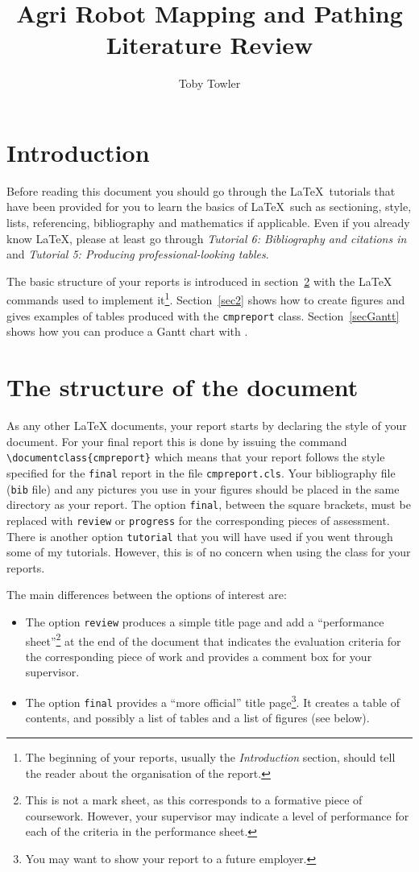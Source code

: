 \documentclass[review]{cmpreport}
\title{Agri Robot Mapping and Pathing Literature Review}
\author{Toby Towler}
\begin{document}
\section{Introduction}

Before reading this document you should go through the \LaTeX\ tutorials that have been provided for you to learn the basics of \LaTeX\ such as sectioning, style, lists, referencing, bibliography and mathematics if applicable.
Even if you already  know \LaTeX{}, please at least go through \emph{Tutorial 6: Bibliography and citations in \LaTeXe{}} and \emph{Tutorial 5: Producing professional-looking tables}.

The basic structure of your reports is introduced in section~\ref{sec1} with the \LaTeX{} commands used to implement it\footnote{The beginning of your reports, usually the \emph{Introduction} section, should tell the reader about the organisation of the report.}. Section~\ref{sec2} shows how to create figures and gives examples of tables produced with the \verb/cmpreport/ class. Section~\ref{secGantt} shows how you can produce a Gantt chart with \LaTeXe{}. 

\section{The structure of the document} \label{sec1}

As any other \LaTeX{} documents, your report starts by declaring the style of your document. For your final report this is done by issuing the command 
\texttt{\textbackslash{}documentclass\allowbreak [final]\{cmpreport\}}
which means that your report follows the style specified for the \texttt{final} report in the file \texttt{cmpreport.cls}. Your bibliography file (\verb/bib/ file) and any pictures you use in your figures should be placed in the same directory as your report. The option \texttt{final}, between the square brackets, must be replaced with \texttt{review} or \texttt{progress} for the corresponding pieces of assessment.
There is another option \texttt{tutorial} that you will have used if you went through some of my tutorials. However, this is of no concern when using the class for your reports.

The main differences between the options of interest are:
\begin{itemize}
\item The option \texttt{review} produces a simple title page and add a ``performance sheet''\footnote{This is not a mark sheet, as this corresponds to a formative piece of coursework. However, your supervisor may indicate a level of performance for each of the criteria in the performance sheet.} at the end of the document that indicates the evaluation criteria
for the corresponding piece of work and provides a comment box for your supervisor. 
\item The option \texttt{final} provides a ``more official'' title page\footnote{You may want to show your report to a future employer.}. It creates a table of contents, and possibly a list of tables and a list of figures (see below). 
\end{itemize}
\end{document}
